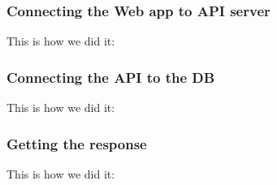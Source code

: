 \begin{frame} \frametitle{Connecting the Web app to API server}

	This is how we did it:

\end{frame}

\begin{frame} \frametitle{Connecting the API to the DB}

	This is how we did it:

\end{frame}

\begin{frame} \frametitle{Getting the response}

	This is how we did it:

\end{frame}